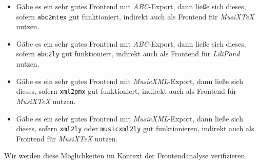 \begin{itemize}
  \item Gäbe es ein sehr gutes Frontend mit \textit{ABC}-Export, dann ließe sich dieses,
  sofern \texttt{abc2mtex} gut funktioniert, indirekt auch als Frontend für
  \textit{MusiX\TeX} nutzen.
  \item Gäbe es ein sehr gutes Frontend mit \textit{ABC}-Export, dann ließe sich dieses,
  sofern \texttt{abc2ly} gut funktioniert, indirekt auch als Frontend für
  \textit{LiliPond} nutzen.
  \item  Gäbe es ein sehr gutes Frontend mit \textit{MusicXML}-Export, dann ließe sich dieses,
  sofern \texttt{xml2pmx} gut funktioniert, indirekt auch als Frontend für
  \textit{MusiX\TeX} nutzen.
  \item Gäbe es ein sehr gutes Frontend mit \textit{MusicXML}-Export, dann ließe
  sich dieses, sofern \texttt{xml2ly} oder \texttt{musicxml2ly} gut
  funktionieren, indirekt auch als Frontend für \textit{MusiX\TeX} nutzen.
\end{itemize}

Wir werden diese Möglichkeiten im Kontext der Frontendanalyse verifizieren.

 

%
